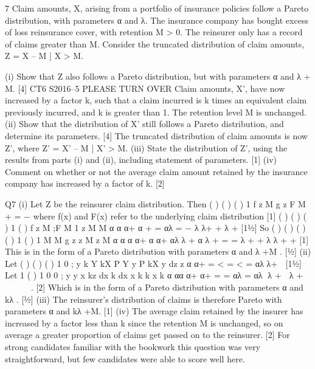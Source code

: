 \documentclass[a4paper,12pt]{article}
\begin{document}
7 Claim amounts, X, arising from a portfolio of insurance policies follow a Pareto
distribution, with parameters α and λ. The insurance company has bought excess of
loss reinsurance cover, with retention M > 0.
The reinsurer only has a record of claims greater than M. Consider the truncated distribution of claim amounts, Z = X – M | X > M.
\begin{enumerate}
(i) Show that Z also follows a Pareto distribution, but with parameters α and
λ + M. [4]
CT6 S2016–5 PLEASE TURN OVER
Claim amounts, X’, have now increased by a factor k, such that a claim incurred is k
times an equivalent claim previously incurred, and k is greater than 1. The retention level M is unchanged.
(ii) Show that the distribution of X’ still follows a Pareto distribution, and
determine its parameters. [4]
The truncated distribution of claim amounts is now Z’, where Z’ = X’ – M | X’ > M.
(iii) State the distribution of Z’, using the results from parts (i) and (ii), including
statement of parameters. [1]
(iv) Comment on whether or not the average claim amount retained by the
insurance company has increased by a factor of k. [2]
\end{enumerate}
\newpage

Q7 (i) Let Z be the reinsurer claim distribution.
Then ( ) ( )
( )
1
f z M
g z
F M
+
  =
  −
where f(x) and F(x) refer to the underlying claim
distribution [1]
( )
( )
( )
1 ( ) f z M ;F M 1
z M M
α α
α+ α
+ = αλ = − λ
λ+ + λ +
  [1½]
So ( )
( )
( ) ( )
1 ( ) 1
M M
g z
z M z M
α α α
α+ α α+
  αλ λ + α λ + = =
  λ + + λ λ + +
  [1]
This is in the form of a Pareto distribution with parameters α and λ +M . [½]
(ii) Let ( ) ( )
( ) 1
0
;
y
k
Y kX P Y y P kX y dz
z
α
α+
  = < = < = αλ
λ+  [1½]
Let
1 ( ) 1
0 0
;
y y x kz dx k dx
x k k x
k
α αα
α+ α+
  = = αλ = αλ
λ +  λ +  
 
  . [2]
Which is in the form of a Pareto distribution with parameters α and kλ . [½]
(iii) The reinsurer’s distribution of claims is therefore Pareto with parameters α
and kλ +M. [1]
(iv) The average claim retained by the insurer has increased by a factor less than k
since the retention M is unchanged, so on average a greater proportion of
claims get passed on to the reinsurer. [2]
For strong candidates familiar with the bookwork this question was very
straightforward, but few candidates were able to score well here.
\end{document}
